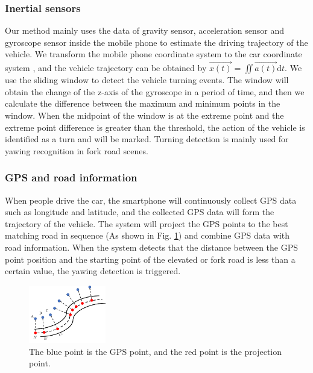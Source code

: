 \documentclass[journal]{IEEEtran}
\begin{document}
\subsubsection{Inertial sensors}
Our method mainly uses the data of gravity sensor, acceleration sensor and gyroscope sensor inside the mobile phone to estimate the driving trajectory of the vehicle. We transform the mobile phone coordinate system to the car coordinate system \cite{xiao2021many, gao2017smartphone}, and the vehicle trajectory can be obtained by $\Vec{x(t)}=\iint\Vec{a(t)}\mathrm{d}t$. We use the sliding window to detect the vehicle turning events. The window will obtain the change of the z-axis of the gyroscope in a period of time, and then we calculate the difference between the maximum and minimum points in the window. When the midpoint of the window is at the extreme point and the extreme point difference is greater than the threshold, the action of the vehicle is identified as a turn and will be marked. Turning detection is mainly used for yawing recognition in fork road scenes.

\subsubsection{GPS and road information}
When people drive the car, the smartphone will continuously collect GPS data such as longitude and latitude, and the collected GPS data will form the trajectory of the vehicle. The system will project the GPS points to the best matching road in sequence (As shown in Fig. \ref{fig:projection}) and combine GPS data with road information. When the system detects that the distance between the GPS point position and the starting point of the elevated or fork road is less than a certain value, the yawing detection is triggered.

\begin{figure}[htbp]
    \centerline{\includegraphics[width=0.3\textwidth]{fig/projection.pdf}}
    \caption{The blue point is the GPS point, and the red point is the projection point.}
    \label{fig:projection}
\end{figure}
\end{document}
